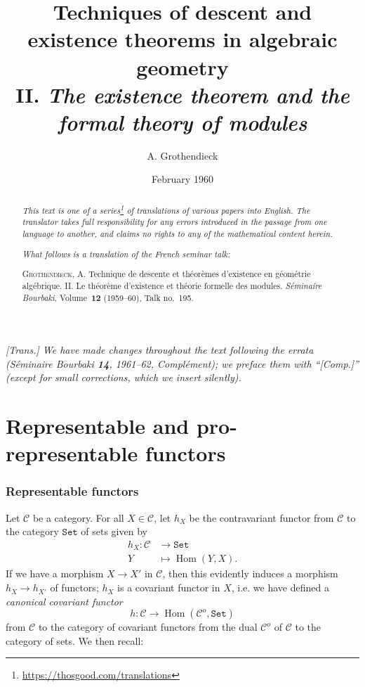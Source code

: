 \documentclass{article}
\title{Techniques of descent and existence theorems in algebraic geometry\\II. \emph{The existence theorem and the formal theory of modules}}
\author{A. Grothendieck}
\date{February 1960}
\newcommand{\doctype}{French seminar talk}
\newcommand{\origcit}{%
  \textsc{Grothendieck, A.}
  Technique de descente et th\'{e}or\`{e}mes d'existence en g\'{e}om\'{e}trie alg\'{e}brique. II. Le th\'{e}or\`{e}me d'existence et th\'{e}orie formelle des modules.
  \emph{S\'{e}minaire Bourbaki}, Volume~\textbf{12} (1959--60), Talk no.~195.%
}
\renewcommand{\cal}[1]{{\mathcal{#1}}}
\newcommand{\Set}{\mathtt{Set}}
\DeclareMathOperator{\Hom}{Hom}
\newcommand{\oldpage}[1]{\marginpar{\footnotesize$\Big\vert$ \textit{p.~#1}}}
\begin{document}
\maketitle
\thispagestyle{fancy}

\renewcommand{\abstractname}{Translator's note.}

\begin{abstract}
  \renewcommand*{\thefootnote}{\fnsymbol{footnote}}
  \emph{This text is one of a series\footnote{\url{https://thosgood.com/translations}} of translations of various papers into English.}
  \emph{The translator takes full responsibility for any errors introduced in the passage from one language to another, and claims no rights to any of the mathematical content herein.}

  \medskip
  
  \emph{What follows is a translation of the \doctype:}

  \medskip\noindent
  \origcit
\end{abstract}

\setcounter{footnote}{0}

\setcounter{tocdepth}{1}
\tableofcontents



\subsubsection*{}

\emph{[Trans.] We have made changes throughout the text following the errata (\emph{S\'{e}minaire Bourbaki} \textbf{14}, 1961--62, Compl\'{e}ment); we preface them with ``[Comp.]'' (except for small corrections, which we insert silently).}
\medskip

\oldpage{195-01}
\part{Representable and pro-representable functors}
\label{A}

\section{Representable functors}
\label{A.1}

Let $\cal{C}$ be a category.
For all $X\in\cal{C}$, let $h_X$ be the contravariant functor from $\cal{C}$ to the category $\Set$ of sets given by
\[
  \begin{aligned}
    h_X\colon \cal{C} &\to \Set
  \\Y&\mapsto \Hom(Y,X).
  \end{aligned}
\]
If we have a morphism $X\to X'$ in $\cal{C}$, then this evidently induces a morphism $h_X\to h_{X'}$ of functors;
$h_X$ is a covariant functor in $X$, i.e. we have defined a \emph{canonical covariant functor}
\[
  h\colon \cal{C} \to \Hom(\cal{C}^o,\Set)
\]
from $\cal{C}$ to the category of covariant functors from the dual $\cal{C}^o$ of $\cal{C}$ to the category of sets.
We then recall:
\end{document}

